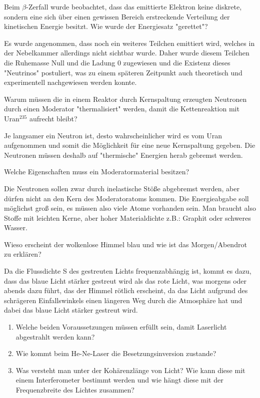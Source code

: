 \documentclass[12pt,a4paper,ngerman]{article}
\begin{document}
\pagebreak

\begin{framed}
Beim $\beta$-Zerfall wurde beobachtet, dass das emittierte Elektron keine diskrete, sondern eine sich über einen gewissen Bereich erstreckende Verteilung der kinetischen Energie besitzt. Wie wurde der Energiesatz "gerettet"?
\end{framed}
Es wurde angenommen, dass noch ein weiteres Teilchen emittiert wird, welches in der Nebelkammer allerdings nicht sichtbar wurde. Daher wurde diesem Teilchen die Ruhemasse Null und die Ladung 0 zugewiesen und die Existenz dieses "Neutrinos" postuliert, was zu einem späteren Zeitpunkt auch theoretisch und experimentell nachgewiesen werden konnte. 



\begin{framed}
Warum müssen die in einem Reaktor durch Kernspaltung erzeugten Neutronen durch einen Moderator "thermalisiert" werden, damit die Kettenreaktion mit Uran$^{235}$ aufrecht bleibt?
\end{framed}

Je langsamer ein Neutron ist, desto wahrscheinlicher wird es vom Uran aufgenommen und somit die Möglichkeit für eine neue Kernspaltung gegeben. Die Neutronen müssen deshalb auf "thermische" Energien herab gebremst werden. 

\begin{framed}
Welche Eigenschaften muss ein Moderatormaterial besitzen?
\end{framed}
Die Neutronen sollen zwar durch inelastische Stöße abgebremst werden, aber dürfen nicht an den Kern des Moderatoratoms kommen. Die Energieabgabe soll möglichst groß sein, es müssen also viele Atome vorhanden sein. Man braucht also Stoffe mit leichten Kerne, aber hoher Materialdichte z.B.: Graphit oder schweres Wasser. 


\begin{framed}
Wieso erscheint der wolkenlose Himmel blau und wie ist das Morgen/Abendrot zu erklären?
\end{framed}
Da die Flussdichte S des gestreuten Lichts frequenzabhängig ist, kommt es dazu, dass das blaue Licht stärker gestreut wird als das rote Licht, was morgens oder abends dazu führt, das der Himmel rötlich erscheint, da das Licht aufgrund des schrägeren Einfallswinkels einen längeren Weg durch die Atmosphäre hat und dabei das blaue Licht stärker gestreut wird. 

\pagebreak

\begin{framed}
\begin{enumerate}
\item Welche beiden Voraussetzungen müssen erfüllt sein, damit Laserlicht abgestrahlt werden kann?
\item Wie kommt beim He-Ne-Laser die Besetzungsinversion zustande?
\item Was versteht man unter der Kohärenzlänge von Licht? Wie kann diese mit einem Interferometer bestimmt werden und wie hängt diese mit der Frequenzbreite des Lichtes zusammen?
\end{enumerate}
\end{framed}
\end{document}
